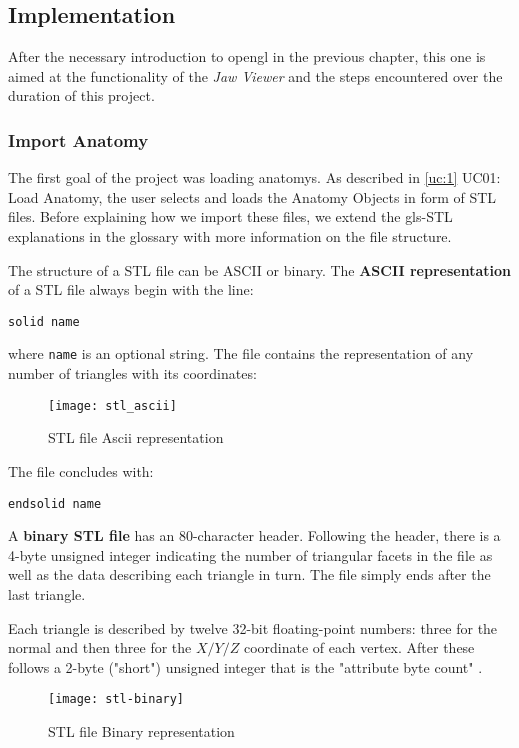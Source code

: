 
\subsection{Implementation}
After the necessary introduction to \gls{opengl} in the previous chapter, this one is aimed at the functionality of the \emph{Jaw Viewer} and the steps encountered over the duration of this project.

\subsubsection{Import Anatomy}

The first goal of the project was loading \glspl{anatomy}. As described in \ref{uc:1} UC01: Load Anatomy, the user selects and loads the Anatomy Objects in form of \gls{STL} files. Before explaining how we import these files, we extend the \gls{gls-STL} explanations in the glossary with more information on the file structure. 



The structure of a STL file can be ASCII or binary. The \textbf{ASCII representation} of a STL file always begin with the line: 

\centerline{\texttt{solid name}}
 
\noindent where \verb|name| is an optional string. The file contains the representation of any number of triangles with its coordinates:

\begin{figure}[h!]
	\centering
	\texttt{[image: stl\_ascii]}
	\caption{STL file Ascii representation \cite{stl-wikipedia}}
\end{figure}


\noindent The file concludes with: 

\centerline{\texttt{endsolid name}}
\bigskip


A \textbf{binary STL file} has an 80-character header. Following the header, there is a 4-byte unsigned integer indicating the number of triangular facets in the file as well as the data describing each triangle in turn. The file simply ends after the last triangle.

\noindent Each triangle is described by twelve 32-bit floating-point numbers: three for the normal and then three for the $X/Y/Z$ coordinate of each vertex. After these follows a 2-byte ("short") unsigned integer that is the "attribute byte count" \cite{stl-wikipedia}.

\begin{figure}[h!]
	\centering
	\texttt{[image: stl-binary]}
	\caption{STL file Binary representation \cite{stl-wikipedia}}
\end{figure}


